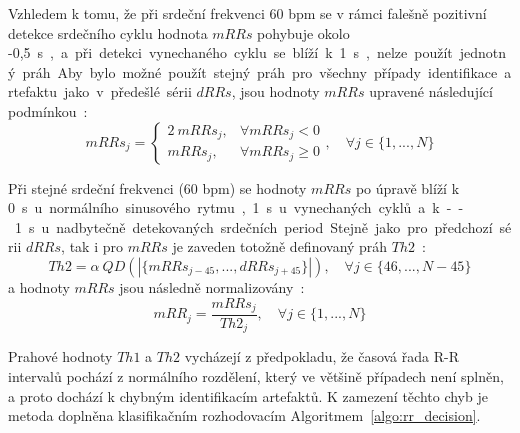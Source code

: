 Vzhledem k tomu, že při srdeční frekvenci 60 bpm se v rámci falešně pozitivní detekce 
srdečního cyklu hodnota $mRRs$ pohybuje okolo -0,5~\si\s, a při detekci
vynechaného cyklu se blíží k 1~\si\s, nelze použít jednotný práh. Aby bylo
možné použít stejný práh pro všechny případy identifikace artefaktu jako v
předešlé sérii $dRRs$, jsou hodnoty $mRRs$ upravené následující
podmínkou~\cite{Lipponen2019}:
\begin{equation}
    mRRs_j =
    \begin{cases}
        2~mRRs_j, & \forall mRRs_j < 0    \\
        mRRs_j,   & \forall mRRs_j \geq 0
    \end{cases}
    , \quad \forall j \in \{1,...,N\}
\end{equation}

Při stejné srdeční frekvenci (60 bpm) se hodnoty $mRRs$ po úpravě blíží k
0~\si\s~u normálního sinusového rytmu, 1~\si\s~ u vynechaných cyklů a k
--1~\si\s~ u nadbytečně detekovaných srdečních period. Stejně jako pro předchozí
sérii $dRRs$, tak i pro $mRRs$ je zaveden totožně definovaný práh
$Th2$~\cite{Lipponen2019}:
\begin{equation}
    Th2 = \alpha~QD(|\{mRRs_{j-45},...,dRRs_{j+45}\}|), \quad \forall j \in \{46,...,N-45\}
\end{equation}
a hodnoty $mRRs$ jsou následně normalizovány~\cite{Lipponen2019}:
\begin{equation}
    mRR_j = \frac{mRRs_j}{Th2_j}, \quad \forall j \in \{1,...,N\}
\end{equation}

Prahové hodnoty $Th1$ a $Th2$ vycházejí z předpokladu, že časová řada R-R
intervalů pochází z normálního rozdělení, který ve většině případech není
splněn, a proto dochází k chybným identifikacím artefaktů. K zamezení těchto
chyb je metoda doplněna klasifikačním rozhodovacím Algoritmem~\ref{algo:rr_decision}.

